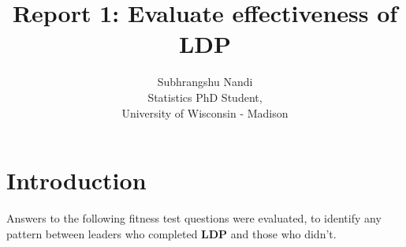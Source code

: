\documentclass[11pt]{extarticle} %
\begin{document}

\title{Report 1: Evaluate effectiveness of LDP}
\author{Subhrangshu Nandi\\
  Statistics PhD Student, \\
  University of Wisconsin - Madison}
\date{}

\maketitle

\newpage
\section*{Introduction}
Answers to the following fitness test questions were evaluated, to identify any pattern between leaders who completed {\bf{LDP}} and those who didn't. 
\end{document}
